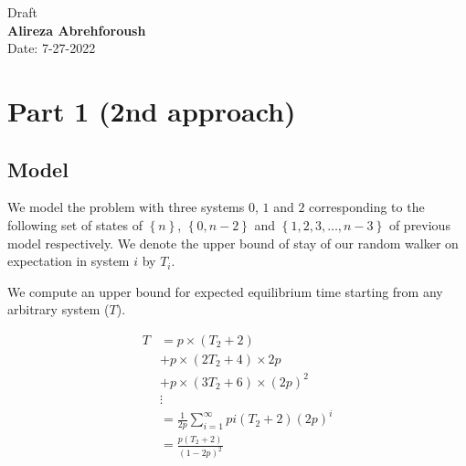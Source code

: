 \documentclass[]{book}
\theoremstyle{definition}
\begin{document}
\begin{center}
{\Large Draft}\\
\textbf{Alireza Abrehforoush}\\ %
Date: 7-27-2022 %
\end{center}
\vspace{0.2 cm}


\section{Part 1 (2nd\hspace{0.1cm} approach)}
\subsection{Model}
We model the problem with three systems $0$, $1$ and $2$ corresponding to the following set of states of $\left\{ n \right\}$, $\left\{0, n-2\right\}$ and $\left\{1,2,3,\hdots,n-3\right\}$ of previous model respectively. We denote the upper bound of stay of our random walker on expectation in system $i$ by $T_{i}$. 

\begin{center}
\end{center}

We compute an upper bound for expected equilibrium time starting from any arbitrary system ($T$).

\begin{equation}\label{}
\begin{split}
    T &= p\times \left(T_{2} + 2\right) \\
      &+ p\times \left(2T_{2} + 4\right)\times 2p \\
      &+ p\times \left(3T_{2} + 6\right)\times \left(2p\right)^2 \\
      & \vdots \\
      &= \frac{1}{2p} \sum_{i=1}^{\infty} p i \left(T_{2} + 2\right)\left(2p\right)^i \\
      &= \frac{p\left(T_{2} + 2\right)}{\left(1-2p\right)^2}
\end{split}
\end{equation}
\end{document}
